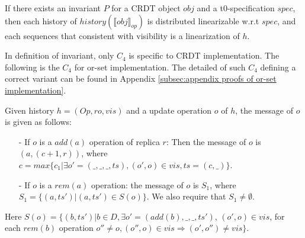 \begin{lemma}
\label{lemma:invariant of operation-based CRDT implies distributed linearizability}
If there exists an invariant $P$ for a CRDT object $\mathit{obj}$ and a t0-specification $\mathit{spec}$, then each history of $\mathit{history}(\llbracket \mathit{obj} \rrbracket_{\mathit{op}})$ is distributed linearizable w.r.t $\mathit{spec}$, and each sequences that consistent with visibility is a linearization of $h$.
\end{lemma}

In definition of invariant, only $C_4$ is specific to CRDT implementation. The following is the $C_4$ for or-set implementation. The detailed of such $C_4$ defining a correct variant can be found in Appendix \ref{subsec:appendix proofs of or-set implementation}.

\begin{example}
\label{example:c4 for or-set implementation}

Given history $h = (\mathit{Op},\mathit{ro},\mathit{vis})$ and a update operation $o$ of $h$, the message of $o$ is given as follows:

\begin{itemize}
\setlength{\itemsep}{0.5pt}
\item[-] If $o$ is a $\mathit{add}(a)$ operation of replica $r$:  Then the message of $o$ is $(a,(c+1,r))$, where $c = \mathit{max}\{ c_1 \vert \exists o' = (\_,\_,\_,\mathit{ts}), (o',o) \in \mathit{vis}, \mathit{ts} = (c,\_) \}$. 

\item[-] If $o$ is a $\mathit{rem}(a)$ operation: the message of $o$ is $S_1$, where $S_1 = \{ (a,\mathit{ts}') \vert (a,\mathit{ts}') \in S(o) \}$. We also require that $S_1 \neq \emptyset$.
\end{itemize}
Here $S(o) = \{ (b,\mathit{ts}') \vert b \in D, \exists o' = (\mathit{add}(b),\_,\_,\mathit{ts}')$, $(o',o) \in \mathit{vis}$, for each $\mathit{rem}(b)$ operation $o'' \neq o, (o'',o) \in \mathit{vis} \Rightarrow (o',o'') \neq \mathit{vis} \}$.
\end{example}












